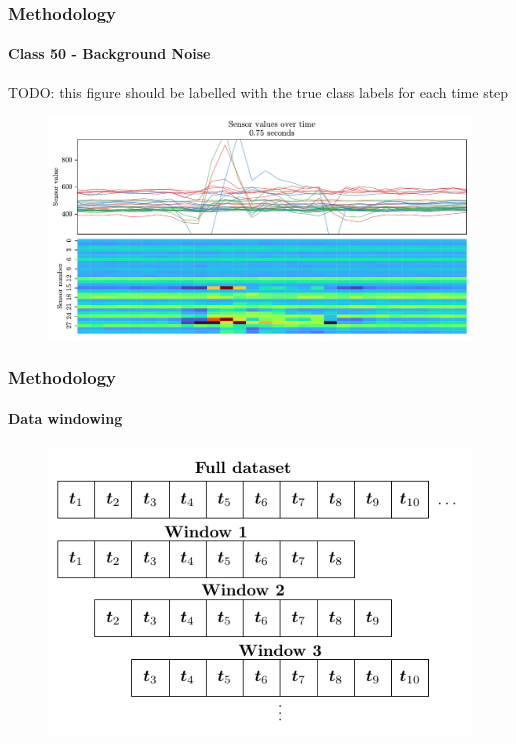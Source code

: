 \documentclass[xcolor={svgnames,table},10pt,fleqn]{beamer}
\begin{document}
\begin{frame}
    \frametitle{Methodology}
    \framesubtitle{Class 50 - Background Noise}

    TODO: this figure should be labelled with the true class labels for each
    time step
    \begin{figure}[h]
        \centering
        \includegraphics[width=\textwidth]{05_sensors_over_time_3230_30}
    \end{figure}
\end{frame}

\begin{frame}
    \frametitle{Methodology}
    \framesubtitle{Data windowing}
    \begin{figure}[h]
        \centering
        \includegraphics[width=\textwidth]{windowing_tikz.pdf}
    \end{figure}
\end{frame}
\end{document}
